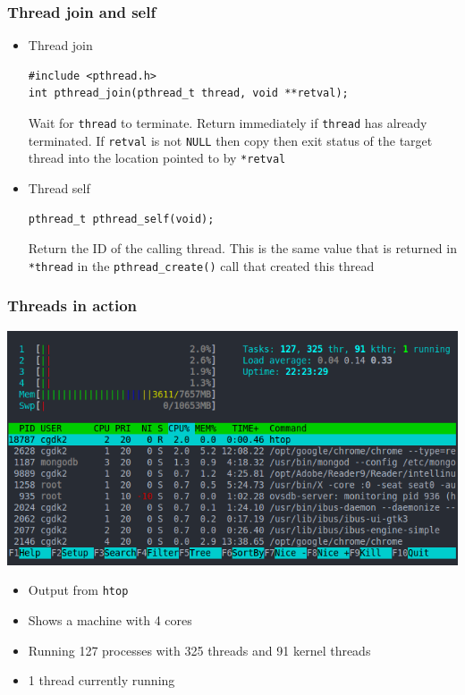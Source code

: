 \documentclass[hyperref={pdfpagelabels=false},svgnames]{beamer}
\begin{document}
\begin{frame}[fragile]
  \frametitle{Thread join and self}
  \begin{itemize}
    \item Thread join
      \begin{verbatim}
#include <pthread.h>
int pthread_join(pthread_t thread, void **retval);
      \end{verbatim}
      Wait for \verb'thread' to terminate. Return immediately if
      \verb'thread' has already terminated. If \verb'retval' is not
      \verb'NULL' then copy then exit status of the target thread
      into the location pointed to by \verb'*retval'
    \item Thread self
      \begin{verbatim}
pthread_t pthread_self(void);
      \end{verbatim}
      Return the ID of the calling thread. This is the same value
      that is returned in \verb'*thread' in the \verb'pthread_create()' call
      that created this thread
  \end{itemize}
\end{frame}

\begin{frame}
  \frametitle{Threads in action}
  \begin{center}
    \includegraphics[width=.75\textwidth]{fig02}
  \end{center}
  \begin{itemize}
    \item Output from \texttt{htop}
    \item Shows a machine with 4 cores
    \item Running 127 processes with 325 threads and 91 kernel threads
    \item 1 thread currently running
  \end{itemize}
\end{frame}
\end{document}
